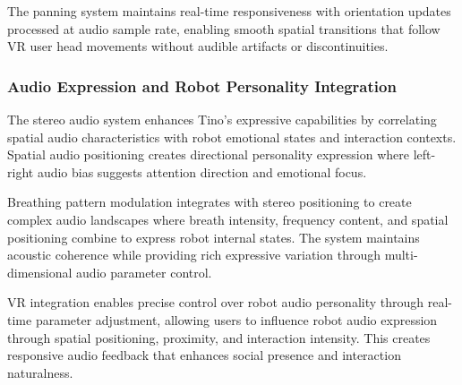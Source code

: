 The panning system maintains real-time responsiveness with orientation updates processed at audio sample rate, enabling smooth spatial transitions that follow VR user head movements without audible artifacts or discontinuities.

\subsubsection{Audio Expression and Robot Personality Integration}

The stereo audio system enhances Tino's expressive capabilities by correlating spatial audio characteristics with robot emotional states and interaction contexts. Spatial audio positioning creates directional personality expression where left-right audio bias suggests attention direction and emotional focus.

Breathing pattern modulation integrates with stereo positioning to create complex audio landscapes where breath intensity, frequency content, and spatial positioning combine to express robot internal states. The system maintains acoustic coherence while providing rich expressive variation through multi-dimensional audio parameter control.

VR integration enables precise control over robot audio personality through real-time parameter adjustment, allowing users to influence robot audio expression through spatial positioning, proximity, and interaction intensity. This creates responsive audio feedback that enhances social presence and interaction naturalness.

